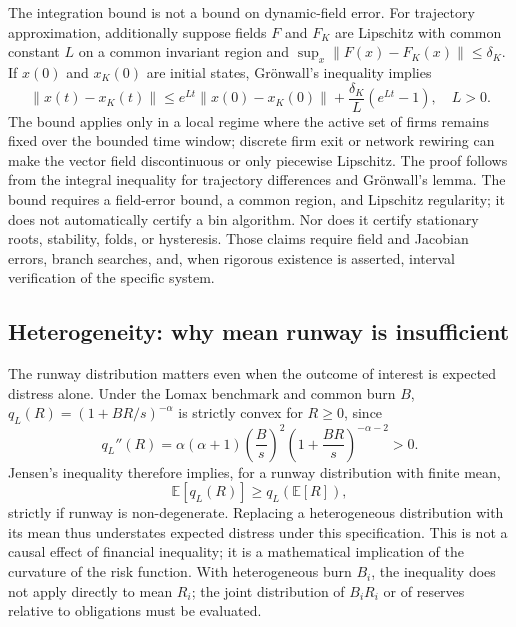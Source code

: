 \documentclass[11pt,a4paper]{article}
\begin{document}
The integration bound is not a bound on dynamic-field error. For trajectory approximation, additionally suppose fields $F$ and $F_K$ are Lipschitz with common constant $L$ on a common invariant region and $\sup_x\|F(x)-F_K(x)\|\leq\delta_K$. If $x(0)$ and $x_K(0)$ are initial states, Grönwall’s inequality implies
\begin{equation}
\|x(t)-x_K(t)\|\leq e^{Lt}\|x(0)-x_K(0)\|+\frac{\delta_K}{L}(e^{Lt}-1),\quad L>0. \label{eq:gronwall}
\end{equation}
The bound applies only in a local regime where the active set of firms remains fixed over the bounded time window; discrete firm exit or network rewiring can make the vector field discontinuous or only piecewise Lipschitz. The proof follows from the integral inequality for trajectory differences and Grönwall’s lemma. The bound requires a field-error bound, a common region, and Lipschitz regularity; it does not automatically certify a bin algorithm. Nor does it certify stationary roots, stability, folds, or hysteresis. Those claims require field and Jacobian errors, branch searches, and, when rigorous existence is asserted, interval verification of the specific system.

\subsection{Heterogeneity: why mean runway is insufficient}
The runway distribution matters even when the outcome of interest is expected distress alone. Under the Lomax benchmark and common burn $B$, $q_L(R)=(1+BR/s)^{-\alpha}$ is strictly convex for $R\geq0$, since
\begin{equation}
q_L''(R)=\alpha(\alpha+1)\left(\frac{B}{s}\right)^2\left(1+\frac{BR}{s}\right)^{-\alpha-2}>0.
\end{equation}
Jensen's inequality therefore implies, for a runway distribution with finite mean,
\begin{equation}
\mathbb E[q_L(R)]\geq q_L(\mathbb E[R]),
\label{eq:jensen_distress}
\end{equation}
strictly if runway is non-degenerate. Replacing a heterogeneous distribution with its mean thus understates expected distress under this specification. This is not a causal effect of financial inequality; it is a mathematical implication of the curvature of the risk function. With heterogeneous burn $B_i$, the inequality does not apply directly to mean $R_i$; the joint distribution of $B_iR_i$ or of reserves relative to obligations must be evaluated.
\end{document}
